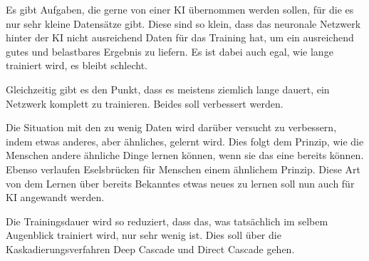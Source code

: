 Es gibt Aufgaben, die gerne von einer KI übernommen werden sollen, für die es nur sehr kleine Datensätze gibt. Diese sind so klein, dass das 
neuronale Netzwerk hinter der KI nicht ausreichend Daten für das Training hat, um ein ausreichend gutes und belastbares Ergebnis zu liefern. 
Es ist dabei auch egal, wie lange trainiert wird, es bleibt schlecht. 

Gleichzeitig gibt es den Punkt, dass es meistens ziemlich lange dauert, ein Netzwerk komplett zu trainieren. Beides soll verbessert werden. 

Die Situation mit den zu wenig Daten wird darüber versucht zu verbessern, indem etwas anderes, aber ähnliches, gelernt wird. Dies folgt dem 
Prinzip, wie die Menschen andere ähnliche Dinge lernen können, wenn sie das eine bereits können. Ebenso verlaufen Eselsbrücken für Menschen 
einem ähnlichem Prinzip. Diese Art von dem Lernen über bereits Bekanntes etwas neues zu lernen soll nun auch für KI angewandt werden. 

Die Trainingsdauer wird so reduziert, dass das, was tatsächlich im selbem Augenblick trainiert wird, nur sehr wenig ist. Dies soll über die 
Kaskadierungsverfahren Deep Cascade und Direct Cascade gehen. 
